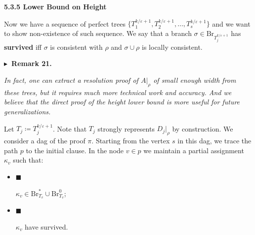 \par\medskip\noindent\textbf{
5.3.5 Lower Bound on Height}\par




Now we have a sequence of perfect trees $\{T^{k/\varepsilon+1}_{1},T^{k/\varepsilon+1}_{2},\dots,T^{k/\varepsilon+1}_{s}\}$ and we want to show non-existence of such sequence. We say that a
branch $\sigma\in\mathrm{Br}_{T^{k/\varepsilon+1}_{j}}$ has \textbf{survived} iff $\sigma$ is consistent with
$\rho$ and $\sigma\cup\rho$ is locally consistent.\par





\par\medskip\noindent\textbf{
$\blacktriangleright$ Remark 21.
}\par



\emph{In fact, one can extract a resolution proof of $A|_{\rho}$ of small enough width from these
trees, but it requires much more technical work and accuracy. And we believe that the direct proof
of the height lower bound is more useful for future generalizations.}\par






Let $T_{j}\coloneqq T^{k/\varepsilon+1}_{j}$. Note that $T_{j}$ strongly represents $D_{j}|_{\rho}$ by
construction. We consider a dag of the proof $\pi$. Starting from the vertex $s$ in this dag, we trace
the path $p$ to the initial clause. In the node $v\in p$ we maintain a partial assignment $\kappa_{v}$
such that:\par


\begin{itemize}


\item[] 
$\blacksquare$ 


$\kappa_{v}\in\mathrm{Br}^{*}_{T_{v}}\cup\mathrm{Br}^{0}_{T_{v}}$;\par





\item[] 
$\blacksquare$ 


$\kappa_{v}$ have survived.\par





\end{itemize}




